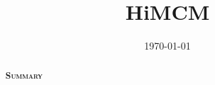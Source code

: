 \documentclass{class}
\title{HiMCM}
\date{\today}
\begin{document}
\begin{abstract}

\begin{center}
{\large\scshape\bfseries Summary}
\end{center}
\begin{changemargin}{0.3in}{0.3in} 

\end{changemargin} 
\end{abstract}

\maketitle






\begin{changemargin}{0.3in}{0.3in}
{%
\tableofcontents
}
\end{changemargin}

\setlength{\parskip}{0.05em}

\newpage


















\newpage



{\scriptsize

}

\pagebreak


\end{document}
